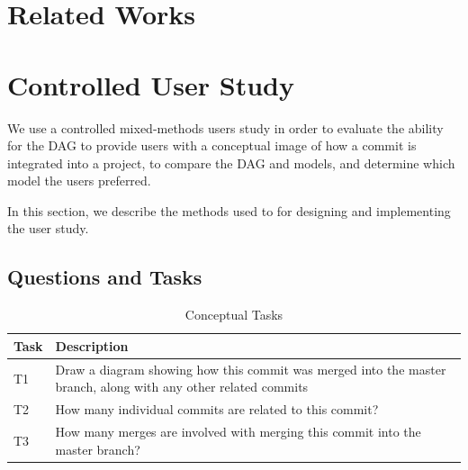 \documentclass[draft]{IEEEtran}
\begin{document}
\section{Related Works}
\label{sec:related_works}



\section{Controlled User Study}
\label{sec:study}




We use a controlled mixed-methods users study in order to evaluate the
ability for the DAG to provide users with a conceptual image of how a
commit is integrated into a project, to compare the DAG and \mt models,
and determine which model the users preferred.

In this section, we describe the methods used to for designing and
implementing the user study.


\subsection{Questions and Tasks}
\label{sub:questions}



\begin{table}[htpb]
  \centering
  \caption{Conceptual Tasks }
  \label{tab:conceptual_tasks}
  \begin{tabulary}{0.9\textwidth}{LL}
    \toprule
    Task & Description\\
    \midrule
    T1 & Draw a diagram showing how this commit was merged into the master branch, along with any other related commits\\
    T2 & How many individual commits are related to this commit?\\
    T3 & How many merges are involved with merging this commit into the master branch?\\
    \bottomrule
  \end{tabulary}
\end{table}
\end{document}
